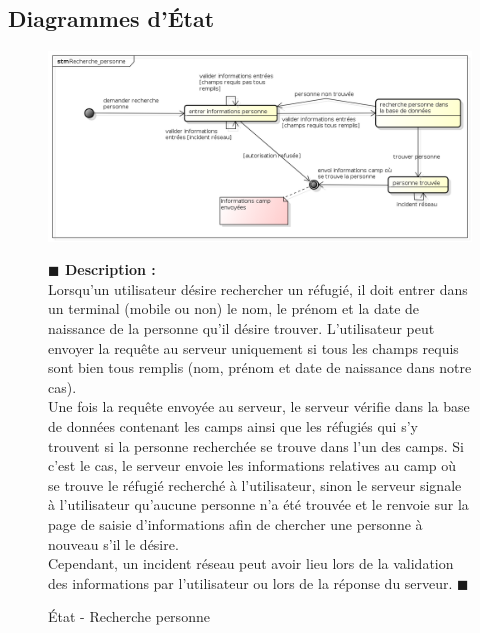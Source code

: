 \documentclass[11pt, titlepage]{report}
\newcommand{\debutDescription}{\noindent\textbf{\textcolor{DescriptionColor}{$\blacksquare$  Description : \\}}}
\newcommand{\finDescription}{\noindent\textcolor{DescriptionColor}{$\blacksquare$}}
\begin{document}
\clearpage
\subsection{Diagrammes d’État}
\begin{figure}[h!]
\begin{center}
\includegraphics[scale=.4]{../images/diagrammes/uml/complementaire/etat_Recherche_personne.png}  
\caption{État - Recherche personne}
\end{center}
\debutDescription
Lorsqu'un utilisateur désire rechercher un réfugié, il doit entrer dans un terminal (mobile ou non) le nom, le prénom et la date de naissance de la personne qu'il désire trouver. L'utilisateur peut envoyer la requête au serveur uniquement si tous les champs requis sont bien tous remplis (nom, prénom et date de naissance dans notre cas).\\
	Une fois la requête envoyée au serveur, le serveur vérifie dans la base de données contenant les camps ainsi que les réfugiés qui s'y trouvent si la personne recherchée se trouve dans l'un des camps. Si c'est le cas, le serveur envoie les informations relatives au camp où se trouve le réfugié recherché à l'utilisateur, sinon le serveur signale à l'utilisateur qu'aucune personne n'a été trouvée et le renvoie sur la page de saisie d'informations afin de chercher une personne à nouveau s'il le désire.\\
	Cependant, un incident réseau peut avoir lieu lors de la validation des informations par l'utilisateur ou lors de la réponse du serveur.
\finDescription
\end{figure}
\clearpage
\end{document}
